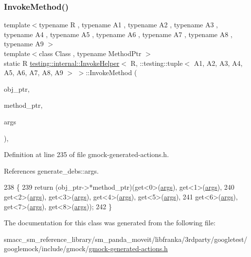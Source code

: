 \subsubsection{\texorpdfstring{Invoke\+Method()}{InvokeMethod()}}
{\footnotesize\ttfamily template$<$typename R , typename A1 , typename A2 , typename A3 , typename A4 , typename A5 , typename A6 , typename A7 , typename A8 , typename A9 $>$ \\
template$<$class Class , typename Method\+Ptr $>$ \\
static R \hyperlink{classtesting_1_1internal_1_1InvokeHelper}{testing\+::internal\+::\+Invoke\+Helper}$<$ R, \+::testing\+::tuple$<$ A1, A2, A3, A4, A5, A6, A7, A8, A9 $>$ $>$\+::Invoke\+Method (\begin{DoxyParamCaption}\item[{Class $\ast$}]{obj\+\_\+ptr,  }\item[{Method\+Ptr}]{method\+\_\+ptr,  }\item[{const \+::testing\+::tuple$<$ A1, A2, A3, A4, A5, A6, A7, A8, A9 $>$ \&}]{args }\end{DoxyParamCaption})\hspace{0.3cm}{\ttfamily [inline]}, {\ttfamily [static]}}



Definition at line 235 of file gmock-\/generated-\/actions.\+h.



References generate\+\_\+debs\+::args.


\begin{DoxyCode}
238                                        \{
239            \textcolor{keywordflow}{return} (obj\_ptr->*method\_ptr)(get<0>(\hyperlink{namespacegenerate__debs_a75f9143e38df82d83b2e8a6f99cae02c}{args}), get<1>(\hyperlink{namespacegenerate__debs_a75f9143e38df82d83b2e8a6f99cae02c}{args}),
240                get<2>(\hyperlink{namespacegenerate__debs_a75f9143e38df82d83b2e8a6f99cae02c}{args}), get<3>(\hyperlink{namespacegenerate__debs_a75f9143e38df82d83b2e8a6f99cae02c}{args}), get<4>(\hyperlink{namespacegenerate__debs_a75f9143e38df82d83b2e8a6f99cae02c}{args}), get<5>(\hyperlink{namespacegenerate__debs_a75f9143e38df82d83b2e8a6f99cae02c}{args}),
241                get<6>(\hyperlink{namespacegenerate__debs_a75f9143e38df82d83b2e8a6f99cae02c}{args}), get<7>(\hyperlink{namespacegenerate__debs_a75f9143e38df82d83b2e8a6f99cae02c}{args}), get<8>(\hyperlink{namespacegenerate__debs_a75f9143e38df82d83b2e8a6f99cae02c}{args}));
242   \}
\end{DoxyCode}


The documentation for this class was generated from the following file\+:\begin{DoxyCompactItemize}
\item 
smacc\+\_\+sm\+\_\+reference\+\_\+library/sm\+\_\+panda\+\_\+moveit/libfranka/3rdparty/googletest/googlemock/include/gmock/\hyperlink{gmock-generated-actions_8h}{gmock-\/generated-\/actions.\+h}\end{DoxyCompactItemize}
